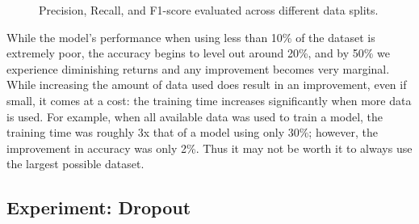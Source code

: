 \documentclass{article}
\begin{document}
\begin{figure}[H]
    \centering
    \caption{Precision, Recall, and F1-score evaluated across different data splits.}
    \label{fig:metrics_vs_split}
\end{figure}

While the model's performance when using less than 10\% of the dataset is extremely poor,
the accuracy begins to level out around 20\%, and by 50\% we experience diminishing returns
and any improvement becomes very marginal. While increasing the amount of data used does
result in an improvement, even if small, it comes at a cost: the training time increases
significantly when more data is used. For example, when all available data was used to train
a model, the training time was roughly 3x that of a model using only 30\%; however, the
improvement in accuracy was only 2\%. Thus it may not be worth it to always use the
largest possible dataset.

\newpage

\subsection{Experiment: Dropout}
\end{document}
